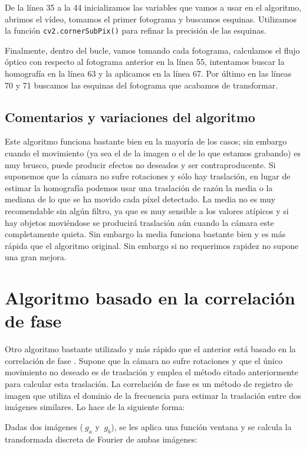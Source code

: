 \documentclass[a4paper,openright, 12pt]{book}
\begin{document}
De la línea 35 a la 44 inicializamos las variables que vamos a usar en el algoritmo, abrimos el vídeo, tomamos el primer fotograma y buscamos esquinas. Utilizamos la función \lstinline|cv2.cornerSubPix()| para refinar la precisión de las esquinas.

Finalmente, dentro del bucle, vamos tomando cada fotograma, calculamos el flujo óptico con respecto al fotograma anterior en la línea 55, intentamos buscar la homografía en la línea 63 y la aplicamos en la línea 67. Por último en las líneas 70 y 71 buscamos las esquinas del fotograma que acabamos de transformar.
 
\subsection{Comentarios y variaciones del algoritmo}
Este algoritmo funciona bastante bien en la mayoría de los casos; sin embargo cuando el movimiento (ya sea el de la imagen o el de lo que estamos grabando) es muy brusco, puede producir efectos no deseados y ser contraproducente. Si suponemos que la cámara no sufre rotaciones y sólo hay traslación, en lugar de estimar la homografía podemos usar una traslación de razón la media o la mediana de lo que se ha movido cada píxel detectado. La media no es muy recomendable sin algún filtro, ya que es muy sensible a los valores atípicos y si hay objetos moviéndose se producirá traslación aún cuando la cámara este completamente quieta. Sin embargo la media funciona bastante bien y es más rápida que el algoritmo original. Sin embargo si no requerimos rapidez no supone una gran mejora.
\newpage
\section{Algoritmo basado en la correlación de fase}
Otro algoritmo bastante utilizado y más rápido que el anterior está basado en la correlación de fase \cite{kug75}. Supone que la cámara no sufre rotaciones y que el único movimiento no deseado es de traslación y emplea el método citado anteriormente para calcular esta traslación.
\newline
La correlación de fase es un método de registro de imagen que utiliza el dominio de la frecuencia para estimar la traslación entre dos imágenes similares. Lo hace de la siguiente forma:


Dadas dos imágenes ($\ g_a$ y $\ g_b$), se les aplica una función ventana y se calcula la transformada discreta de Fourier de ambas imágenes:
  
\end{document}
